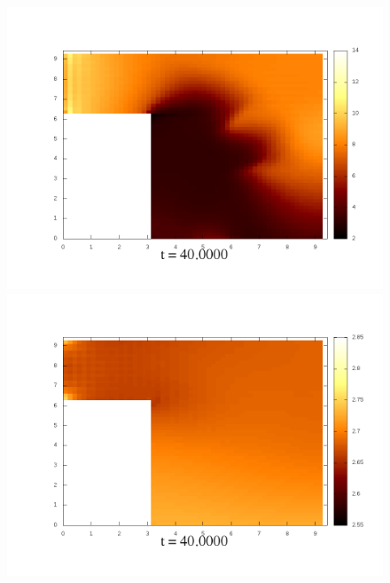 \documentclass[a4paper, 12pt]{article}
\begin{document}
\begin{figure}[h]
	\begin{minipage}[h]{0.4\linewidth}
		\includegraphics[width=1\linewidth]{./img/01_1_1/G/200}
	\end{minipage}
	\hfill
	\begin{minipage}[h]{0.4\linewidth}
		\includegraphics[width=1\linewidth]{./img/01_1_01/G/200}
	\end{minipage}
\end{figure}
\end{document}
